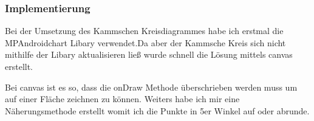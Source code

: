 \subsubsection{Implementierung}

Bei der Umsetzung des Kammschen Kreisdiagrammes habe ich erstmal die MPAndroidchart Libary verwendet.Da aber der Kammsche Kreis sich nicht mithilfe der Libary aktualisieren ließ wurde schnell die Lösung mittels canvas erstellt. 

Bei canvas ist es so, dass die onDraw Methode überschrieben werden muss um auf einer Fläche zeichnen zu können. Weiters habe ich mir eine Näherungsmethode erstellt womit ich die Punkte in 5er Winkel auf oder abrunde.






